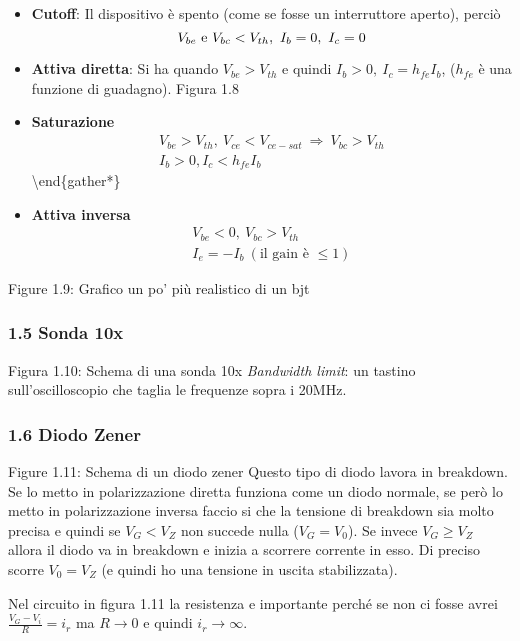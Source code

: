 \documentclass[
]{article}
\begin{document}
\begin{itemize}
\item
  \textbf{Cutoff}: Il dispositivo è spento (come se fosse un
  interruttore aperto), perciò
  \[V_{be}\ {\rm e}\ V_{bc}<V_{th},\ I_{b}=0,\ I_{c}=0\]
\item
  \textbf{Attiva diretta}: Si ha quando \(V_{be}>V_{th}\) e quindi
  \(I_{b}>0,\ I_{c}=h_{fe}I_{b}\), (\(h_{fe}\) è una funzione di
  guadagno). Figura 1.8
\item
  \textbf{Saturazione} \begin{gather*}
  V_{be}>V_{th},\ V_{ce}<V_{ce-sat}\ \Longrightarrow\ V_{bc}>V_{th} \\
  I_{b}>0,I_{c}<h_{fe}I_{b}\
  \end{gather*}\textbackslash end\{gather*\}
\item
  \textbf{Attiva inversa} \begin{gather*}
  V_{be}<0,\ V_{bc}>V_{th} \\
  I_{e} =-I_{b}\ (\text{il gain è }\leq 1)
  \end{gather*}
\end{itemize}

Figure 1.9: Grafico un po' più realistico di un bjt

\subsubsection{1.5 Sonda 10x}\label{sonda-10x}

Figura 1.10: Schema di una sonda 10x \emph{Bandwidth limit}: un tastino
sull'oscilloscopio che taglia le frequenze sopra i 20MHz.

\subsubsection{1.6 Diodo Zener}\label{diodo-zener}

Figure 1.11: Schema di un diodo zener Questo tipo di diodo lavora in
breakdown. Se lo metto in polarizzazione diretta funziona come un diodo
normale, se però lo metto in polarizzazione inversa faccio si che la
tensione di breakdown sia molto precisa e quindi se \(V_{G}<V_{Z}\) non
succede nulla (\(V_{G}=V_{0}\)). Se invece \(V_{G}\geq V_{Z}\) allora il
diodo va in breakdown e inizia a scorrere corrente in esso. Di preciso
scorre \(V_{0}=V_{Z}\) (e quindi ho una tensione in uscita
stabilizzata).

Nel circuito in figura 1.11 la resistenza e importante perché se non ci
fosse avrei \(\frac{V_{G}-V_{i}}{R}=i_{r}\) ma \(R\to 0\) e quindi
\(i_{r}\to\infty\).
\end{document}

